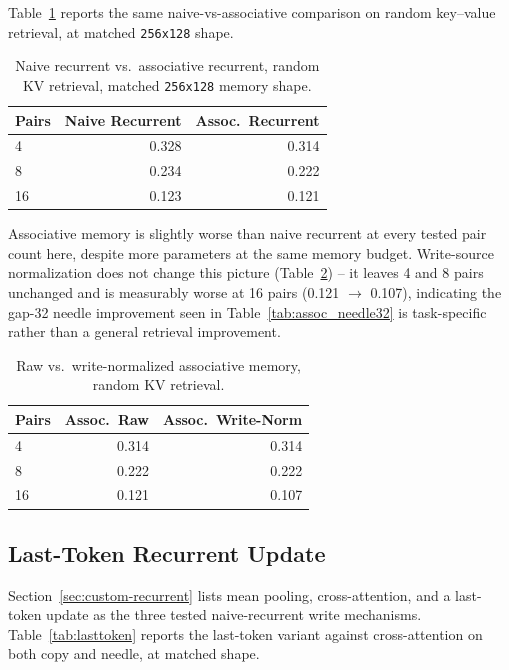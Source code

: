 \documentclass[10pt]{article} %
\begin{document}
Table~\ref{tab:assoc_kv} reports the same naive-vs-associative comparison on
random key--value retrieval, at matched \texttt{256x128} shape.

\begin{table}[h]
\centering
\caption{Naive recurrent vs.\ associative recurrent, random KV retrieval,
matched \texttt{256x128} memory shape.}
\label{tab:assoc_kv}
\begin{tabular}{lrr}
\toprule
Pairs & Naive Recurrent & Assoc.\ Recurrent \\
\midrule
4  & 0.328 & 0.314 \\
8  & 0.234 & 0.222 \\
16 & 0.123 & 0.121 \\
\bottomrule
\end{tabular}
\end{table}

Associative memory is slightly worse than naive recurrent at every tested
pair count here, despite more parameters at the same memory budget.
Write-source normalization does not change this picture
(Table~\ref{tab:assoc_kv_writenorm}) -- it leaves 4 and 8 pairs unchanged
and is measurably worse at 16 pairs (0.121 $\to$ 0.107), indicating the
gap-32 needle improvement seen in Table~\ref{tab:assoc_needle32} is
task-specific rather than a general retrieval improvement.

\begin{table}[h]
\centering
\caption{Raw vs.\ write-normalized associative memory, random KV retrieval.}
\label{tab:assoc_kv_writenorm}
\begin{tabular}{lrr}
\toprule
Pairs & Assoc.\ Raw & Assoc.\ Write-Norm \\
\midrule
4  & 0.314 & 0.314 \\
8  & 0.222 & 0.222 \\
16 & 0.121 & 0.107 \\
\bottomrule
\end{tabular}
\end{table}

\subsection{Last-Token Recurrent Update}

Section~\ref{sec:custom-recurrent} lists mean pooling, cross-attention, and a last-token update as
the three tested naive-recurrent write mechanisms. Table~\ref{tab:lasttoken}
reports the last-token variant against cross-attention on both copy and
needle, at matched shape.
\end{document}
